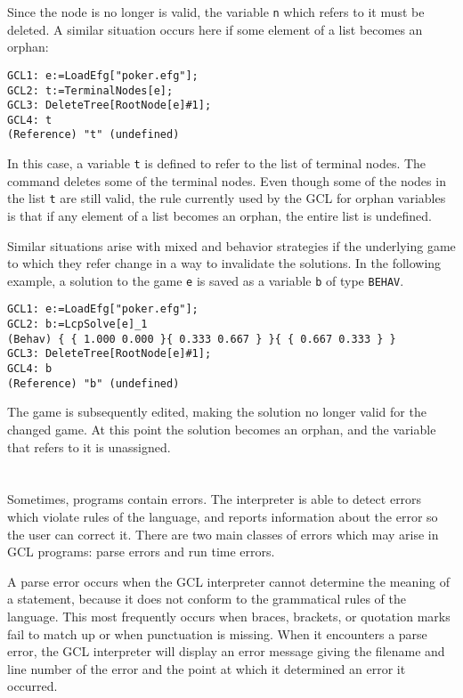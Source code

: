 \noindent
Since the node is no longer is valid, the variable \verb+n+ which
refers to it must be deleted.  A similar situation occurs here if some
element of a list becomes an orphan:

\begin{verbatim}
GCL1: e:=LoadEfg["poker.efg"];
GCL2: t:=TerminalNodes[e];
GCL3: DeleteTree[RootNode[e]#1];
GCL4: t
(Reference) "t" (undefined)
\end{verbatim}

In this case, a variable \verb+t+ is defined to refer to the list of
terminal nodes.  The  command deletes some of the
terminal nodes.  Even though some of the nodes in the list \verb+t+
are still valid, the rule currently used by the GCL for orphan
variables is that if any element of a list becomes an orphan, the
entire list is undefined.  

Similar situations arise with mixed and behavior strategies if the
underlying game to which they refer change in a way to invalidate the
solutions.  In the following example, a solution to the game \verb+e+
is saved as a variable \verb+b+ of type \verb+BEHAV+.  

\begin{verbatim}
GCL1: e:=LoadEfg["poker.efg"];
GCL2: b:=LcpSolve[e]_1
(Behav) { { 1.000 0.000 }{ 0.333 0.667 } }{ { 0.667 0.333 } }
GCL3: DeleteTree[RootNode[e]#1];
GCL4: b
(Reference) "b" (undefined)
\end{verbatim}

The game is subsequently edited, making the solution no longer valid
for the changed game.  At this point the solution becomes an orphan,
and the variable that refers to it is unassigned.  

\section{}

Sometimes, programs contain errors.  The interpreter is able to detect
errors which violate rules of the language, and reports information
about the error so the user can correct it.  There are two main
classes of errors which may arise in GCL programs: parse errors and
run time errors.

A parse error occurs when the GCL interpreter cannot determine the
meaning of a statement, because it does not conform to the grammatical
rules of the language.  This most frequently occurs when braces,
brackets, or quotation marks fail to match up or when punctuation is
missing.  When it encounters a parse error, the GCL interpreter will
display an error message giving the filename and line number of the
error and the point at which it determined an error it occurred.

